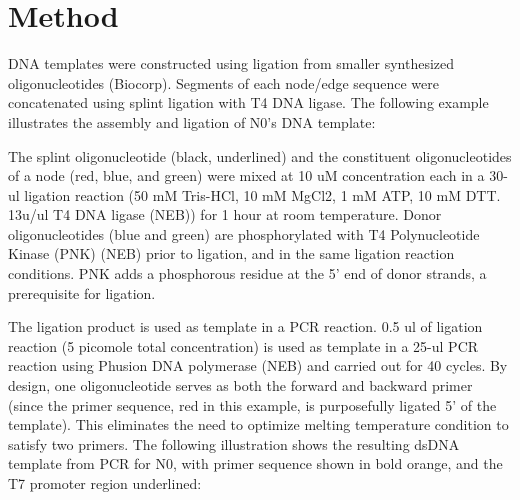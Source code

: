 \section{Method} \label{sec:method}
			DNA templates were constructed using ligation from smaller synthesized oligonucleotides (Biocorp). Segments of each 
			node/edge sequence were concatenated using splint ligation with T4 DNA ligase. The following example illustrates the 
			assembly and ligation of N0’s DNA template: 
			
		
			The splint oligonucleotide (black, underlined) and the constituent oligonucleotides of a node (red, blue, and green) 
			were mixed at 10 uM concentration each in a 30-ul ligation reaction (50 mM Tris-HCl, 10 mM MgCl2, 1 mM ATP, 10 mM DTT. 
			13u/ul T4 DNA ligase (NEB)) for 1 hour at room temperature. Donor oligonucleotides (blue and green) are phosphorylated 
			with T4 Polynucleotide Kinase (PNK) (NEB) prior to ligation, and in the same ligation reaction conditions. PNK adds a 
			phosphorous residue at the 5’ end of donor strands, a prerequisite for ligation. 
		
			The ligation product is used as template in a PCR reaction. 0.5 ul of ligation reaction (5 picomole total concentration) 
			is used as template in a 25-ul PCR reaction using Phusion DNA polymerase (NEB) and carried out for 40 cycles. By design, one 
			oligonucleotide serves as both the forward and backward primer (since the primer sequence, red in this example, is purposefully 
			ligated 5’ of the template). This eliminates the need to optimize melting temperature condition to satisfy two primers. 
			The following illustration shows the resulting dsDNA template from PCR for N0, with primer sequence shown in bold orange, 
			and the T7 promoter region underlined:  


